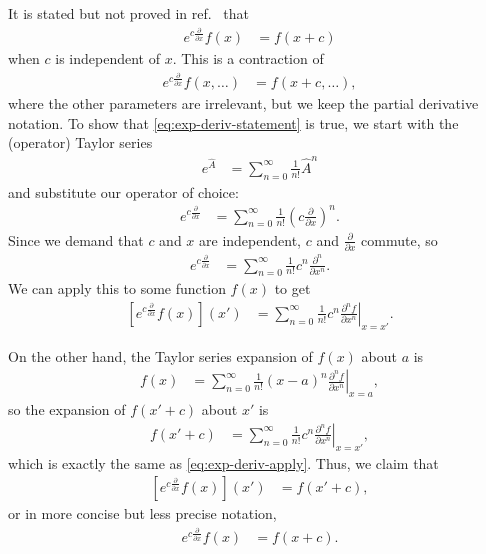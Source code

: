 It is stated but not proved in ref.~\cite{tuckerman1992reversible} that
\begin{align}
	e^{c \frac{\partial}{\partial x}} f(x)
	&= f(x + c)
		\label{eq:exp-deriv-statement}
\end{align}
when $c$ is independent of $x$.
This is a contraction of
\begin{align}
	e^{c \frac{\partial}{\partial x}} f(x, \ldots)
	&= f(x + c, \ldots),
\end{align}
where the other parameters are irrelevant, but we keep the partial derivative notation.
To show that \cref{eq:exp-deriv-statement} is true, we start with the (operator) Taylor series~\cite[48]{sakurai1985modern}
\begin{align}
	e^{\hat{A}}
	&= \sum_{n=0}^\infty \frac{1}{n!} \hat{A}^n
\end{align}
and substitute our operator of choice:
\begin{align}
	e^{c \frac{\partial}{\partial x}}
	&= \sum_{n=0}^\infty \frac{1}{n!} \left( c \frac{\partial}{\partial x} \right)^n.
\end{align}
Since we demand that $c$ and $x$ are independent, $c$ and $\frac{\partial}{\partial x}$ commute, so
\begin{align}
	e^{c \frac{\partial}{\partial x}}
	&= \sum_{n=0}^\infty \frac{1}{n!} c^n \frac{\partial^n}{\partial x^n}.
\end{align}
We can apply this to some function $f(x)$ to get
\begin{align}
	\left[ e^{c \frac{\partial}{\partial x}} f(x) \right] (x')
	&= \sum_{n=0}^\infty \frac{1}{n!} c^n \left. \frac{\partial^n f}{\partial x^n} \right|_{x=x'}.
		\label{eq:exp-deriv-apply}
\end{align}

On the other hand, the Taylor series expansion of $f(x)$ about $a$ is~\cite[735]{stewart2008calculus}
\begin{align}
	f(x)
	&= \sum_{n=0}^\infty \frac{1}{n!} (x-a)^n \left. \frac{\partial^n f}{\partial x^n} \right|_{x=a},
\end{align}
so the expansion of $f(x' + c)$ about $x'$ is
\begin{align}
	f(x' + c)
	&= \sum_{n=0}^\infty \frac{1}{n!} c^n \left. \frac{\partial^n f}{\partial x^n} \right|_{x=x'},
\end{align}
which is exactly the same as \cref{eq:exp-deriv-apply}.
Thus, we claim that
\begin{align}
	\left[ e^{c \frac{\partial}{\partial x}} f(x) \right] (x')
	&= f(x' + c),
\end{align}
or in more concise but less precise notation,
\begin{align}
	e^{c \frac{\partial}{\partial x}} f(x)
	&= f(x + c).
\end{align}

